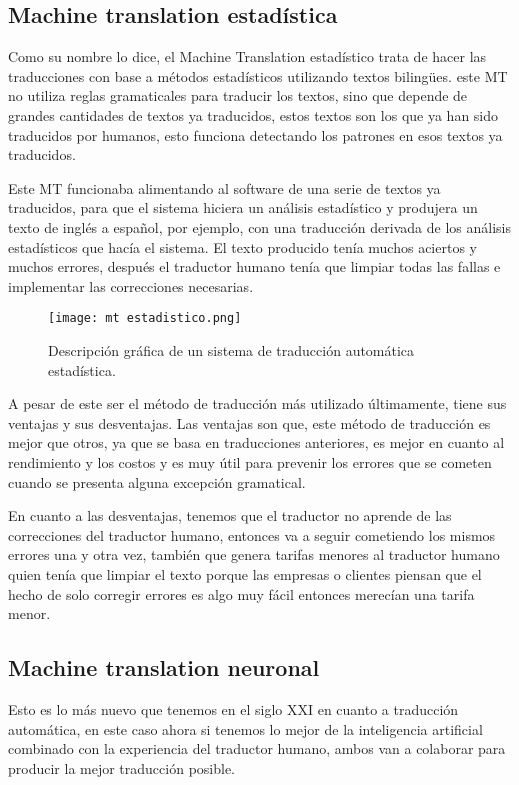 \documentclass[conference]{IEEEtran}
\begin{document}
\subsection{Machine translation estadística}
Como su nombre lo dice, el Machine Translation estadístico trata de hacer las traducciones con base a métodos estadísticos utilizando textos bilingües. este MT no utiliza reglas gramaticales para traducir los textos, sino que depende de grandes cantidades de textos ya traducidos, estos textos son los que ya han sido traducidos por humanos, esto funciona detectando los patrones en esos textos ya traducidos.

Este MT funcionaba alimentando al software de una serie de textos ya traducidos, para que el sistema hiciera un análisis estadístico y produjera un texto de inglés a español, por ejemplo, con una traducción derivada de los análisis estadísticos que hacía el sistema. El texto producido tenía muchos aciertos y muchos errores, después el traductor humano tenía que limpiar todas las fallas e implementar las correcciones necesarias.

\begin{figure}[htp]
        \centering
        \texttt{[image: mt estadistico.png]}
        \label{foto}
        \caption{Descripción gráfica de un sistema de traducción automática estadística.}
    \end{figure}


A pesar de este ser el método de traducción más utilizado últimamente, tiene sus ventajas y sus desventajas.
Las ventajas son que, este método de traducción es mejor que otros, ya que se basa en traducciones anteriores, es mejor en cuanto al rendimiento y los costos y es muy útil para prevenir los errores que se cometen cuando se presenta alguna excepción gramatical.

En cuanto a las desventajas, tenemos que el traductor no aprende de las correcciones del traductor humano, entonces va a seguir cometiendo los mismos errores una y otra vez, también que genera tarifas menores al traductor humano quien tenía que limpiar el texto porque las empresas o clientes piensan que el hecho de solo corregir errores es algo muy fácil entonces merecían una tarifa menor.

\subsection{Machine translation neuronal}
Esto es lo más nuevo que tenemos en el siglo XXI en cuanto a traducción automática, en este caso ahora si tenemos lo mejor de la inteligencia artificial combinado con la experiencia del traductor humano, ambos van a colaborar para producir la mejor traducción posible.
\end{document}
